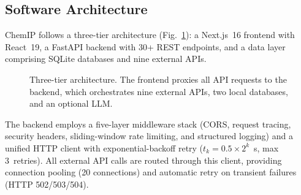 \documentclass[preprint,12pt]{elsarticle}
\begin{document}
\subsection{Software Architecture}
\label{sec:architecture}

ChemIP follows a three-tier architecture (Fig.~\ref{fig:architecture}): a Next.js~16 frontend with React~19, a FastAPI backend with 30+ REST endpoints, and a data layer comprising SQLite databases and nine external APIs.

\begin{figure}[H]
\centering
{}
\caption{Three-tier architecture. The frontend proxies all API requests to the backend, which orchestrates nine external APIs, two local databases, and an optional LLM.}
\label{fig:architecture}
\end{figure}

The backend employs a five-layer middleware stack (CORS, request tracing, security headers, sliding-window rate limiting, and structured logging) and a unified HTTP client with exponential-backoff retry ($t_k = 0.5 \times 2^k$~s, max 3~retries).
All external API calls are routed through this client, providing connection pooling (20 connections) and automatic retry on transient failures (HTTP 502/503/504).
\end{document}
